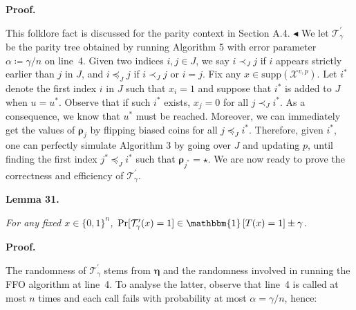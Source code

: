 \documentclass[10pt,a4paper]{article}
\begin{document}
\par\medskip\noindent\textbf{Proof.}\par




This folklore fact is discussed for the parity context in Section A.4.
$\blacktriangleleft$
We let $\mathcal{T}^{\prime}_{\gamma}$ be the parity tree obtained by running Algorithm 5 with error parameter $\alpha\coloneqq\gamma/n$ on line 4. Given two indices $i,j\in J$, we say $i\prec_{J}j$ if $i$ appears strictly earlier than $j$ in $J$, and $i\preceq_{J}j$ if $i\prec_{J}j$ or $i=j$. Fix any $x\in\mathrm{supp}(\mathcal{X}^{v,p})$. Let $i^{*}$ denote the first index $i$ in $J$ such that $x_{i}=1$ and suppose that $i^{*}$ is added to $J$ when $u=u^{*}$. Observe that if such $i^{*}$ exists, $x_{j}=0$ for all $j\prec_{J}i^{*}$. As a consequence, we know that $u^{*}$ must be reached. Moreover, we can immediately get the values of $\bm{\rho}_{j}$ by flipping biased coins for all $j\preceq_{J}i^{*}$. Therefore, given $i^{*}$, one can perfectly simulate Algorithm 3 by going over $J$ and updating $p$, until finding the first index $j^{*}\preceq_{J}i^{*}$ such that $\bm{\rho}_{j^{*}}=\star$. We are now ready to prove the correctness and efficiency of $\mathcal{T}^{\prime}_{\gamma}$.\par





\par\medskip\noindent\textbf{
\textbf{Lemma 31}\textbf{.}
}\par



\emph{For any fixed $x\in\{0,1\}^{n}$, $\Pr[\mathcal{T}^{\prime}_{\gamma}(x)=1]\in\mathbbm{1}\left[T(x)=1\right]\pm\gamma$.}\par







\par\medskip\noindent\textbf{Proof.}\par




The randomness of $\mathcal{T}^{\prime}_{\gamma}$ stems from $\bm{\eta}$ and the randomness involved in running the FFO algorithm at line 4. To analyse the latter, observe that line 4 is called at most $n$ times and each call fails with probability at most $\alpha=\gamma/n$, hence:\par
\end{document}
